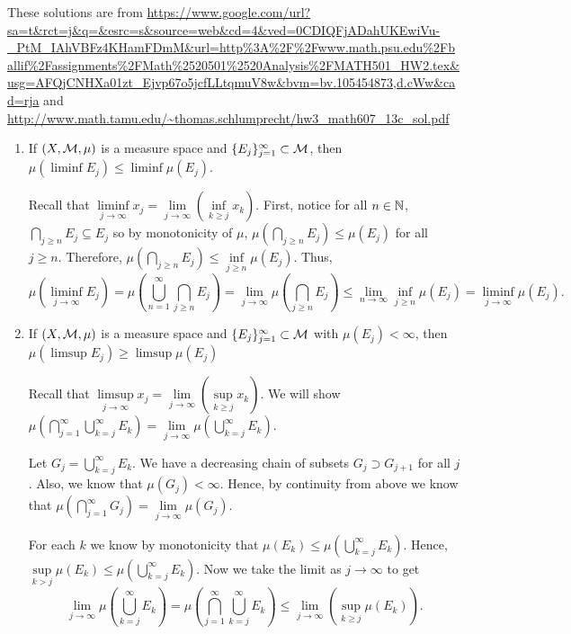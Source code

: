 These solutions are from \url{https://www.google.com/url?sa=t&rct=j&q=&esrc=s&source=web&cd=4&ved=0CDIQFjADahUKEwiVu-_PtM_IAhVBFz4KHamFDmM&url=http%3A%2F%2Fwww.math.psu.edu%2Fballif%2Fassignments%2FMath%2520501%2520Analysis%2FMATH501_HW2.tex&usg=AFQjCNHXa01zt_Ejvp67o5jcfLLtqmuV8w&bvm=bv.105454873,d.cWw&cad=rja} and
\url{http://www.math.tamu.edu/~thomas.schlumprecht/hw3_math607_13c_sol.pdf}
\begin{enumerate}
\item If $(X, {\mathcal M}, \mu)$ is a measure space and $\{ E_j \}_{j=1}^\infty\subset {\mathcal M}$, then $\mu (\liminf E_j) \leq \liminf \mu (E_j)$.
\begin{pf}
Recall that
  $\underset{j\to\infty}{\liminf} x_j=\underset{j\to\infty}{\lim}\left(\underset{k\ge j}{\inf} x_k\right)$.
 First, notice for all $n \in {\mathbb N}$, $\underset{j\geq n}{\bigcap}E_j \subseteq E_j$ so by monotonicity of $\mu$, $\mu\left(\underset{j\geq n}{\bigcap}E_j\right) \leq \mu(E_j)$ for all $j\geq n$. Therefore, $\mu\left(\underset{j\geq n}{\bigcap}E_j\right) \leq \underset{j\geq n}{\inf}\mu(E_j)$. Thus,
  \[
  \mu\left( \underset{j\rightarrow \infty}{\liminf}E_j\right)=\mu\left( \bigcup_{n=1}^\infty \bigcap_{j\geq n}E_j\right)= \underset{j\to\infty}{\lim}\mu\left(\bigcap_{j\geq n} E_j\right)\leq \lim_{n\rightarrow \infty}\inf_{j\geq n}\mu(E_j)= \underset{j\to\infty}{\liminf}\mu(E_j).\]
  \end{pf}

\item If $(X,{\mathcal M}, \mu)$ is a measure space and $\{ E_j \}_{j=1}^\infty\subset {\mathcal M}$ with $\mu(E_j) < \infty$, then\\ $\mu(\limsup E_j) \geq \limsup \mu(E_j)$
	\begin{pf}
 Recall that $\underset{j\to\infty}{\limsup} x_j=\underset{j\to\infty}{\lim}\left(\underset{k\ge j}{\sup} x_k\right)$. We will show
    $\mu\left(\bigcap_{j=1}^\infty\bigcup_{k=j}^\infty E_k\right)=\underset{j\to\infty}{\lim}\mu\left(\bigcup_{k=j}^\infty E_k\right)$.
  \begin{pf}
    Let $G_j=\bigcup_{k=j}^\infty E_k$. We have a decreasing chain of subsets $G_j\supset G_{j+1}$ for all $j$. Also, we know that $\mu(G_j)<\infty$. Hence, by continuity from above we know that $\mu(\bigcap_{j=1}^\infty G_j)=\underset{j\to\infty}{\lim} \mu(G_j)$.
  \end{pf}
For each $k$ we know by monotonicity that $\mu(E_k)\le\mu(\bigcup_{k=j}^\infty E_k)$. Hence, $\underset{k>j}{\sup}\mu(E_k)\le\mu(\bigcup_{k=j}^\infty E_k)$. Now we take the limit as $j\to\infty$ to get
  \[\underset{j\to\infty}{\lim}\mu\left(\bigcup_{k=j}^\infty E_k\right)=\mu\left(\bigcap_{j=1}^\infty\bigcup_{k=j}^\infty E_k\right)\le\underset{j\to\infty}{\lim}\left(\underset{k\ge j}{\sup} \mu(E_k)\right).\]
	

\end{pf}
\end{enumerate}
